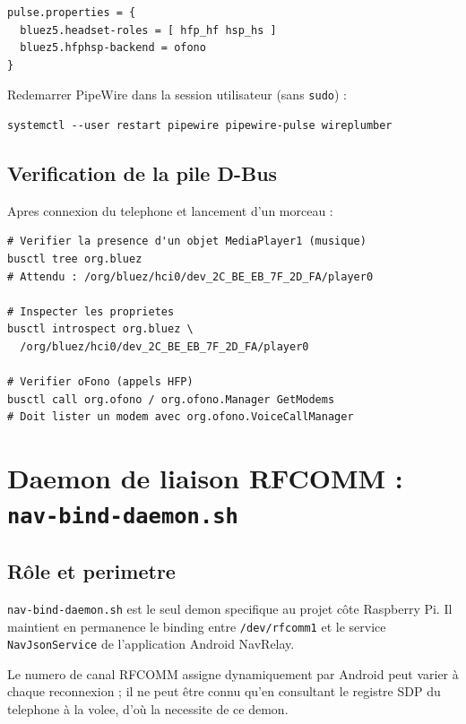 \documentclass[a4paper,11pt]{article}
\begin{document}
\begin{lstlisting}[style=confcode,caption={10-ofono.conf}]
pulse.properties = {
  bluez5.headset-roles = [ hfp_hf hsp_hs ]
  bluez5.hfphsp-backend = ofono
}
\end{lstlisting}

Redemarrer PipeWire dans la session utilisateur (sans \texttt{sudo}) :

\begin{lstlisting}[style=bashcode]
systemctl --user restart pipewire pipewire-pulse wireplumber
\end{lstlisting}

\subsection{Verification de la pile D-Bus}

Apres connexion du telephone et lancement d'un morceau :

\begin{lstlisting}[style=bashcode]
# Verifier la presence d'un objet MediaPlayer1 (musique)
busctl tree org.bluez
# Attendu : /org/bluez/hci0/dev_2C_BE_EB_7F_2D_FA/player0

# Inspecter les proprietes
busctl introspect org.bluez \
  /org/bluez/hci0/dev_2C_BE_EB_7F_2D_FA/player0

# Verifier oFono (appels HFP)
busctl call org.ofono / org.ofono.Manager GetModems
# Doit lister un modem avec org.ofono.VoiceCallManager
\end{lstlisting}

\section{Daemon de liaison RFCOMM : \texttt{nav-bind-daemon.sh}}

\subsection{Rôle et perimetre}

\texttt{nav-bind-daemon.sh} est le seul demon specifique au projet côte Raspberry Pi.
Il maintient en permanence le binding entre \texttt{/dev/rfcomm1} et le service
\texttt{NavJsonService} de l'application Android NavRelay.

Le numero de canal RFCOMM assigne dynamiquement par Android peut varier à chaque
reconnexion ; il ne peut être connu qu'en consultant le registre SDP du telephone
à la volee, d'où la necessite de ce demon.
\end{document}
